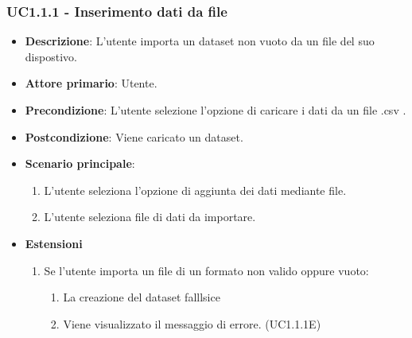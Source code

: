 \subsubsection{UC1.1.1 - Inserimento dati da file}
\begin{itemize}
    \item \textbf{Descrizione}: L'utente importa un dataset non vuoto da un file del suo dispostivo.

    \item \textbf{Attore primario}: Utente.
    
    \item \textbf{Precondizione}:   L'utente selezione l'opzione di caricare i dati da un file .csv .

    \item \textbf{Postcondizione}:  Viene caricato un dataset. 

	\item \textbf{Scenario principale}:
		\begin{enumerate}
			\item L'utente seleziona l'opzione di aggiunta dei dati mediante file.
			\item L'utente seleziona file di dati da importare.
        \end{enumerate}
     
    \item \textbf{Estensioni}
    \begin{enumerate}
    
        \item Se l'utente importa un file di un formato non valido oppure vuoto:
        \begin{enumerate}
            \item La creazione del dataset falllsice
            \item Viene visualizzato il messaggio di errore. (UC1.1.1E)
        \end{enumerate}
    \end{enumerate}
\end{itemize}


